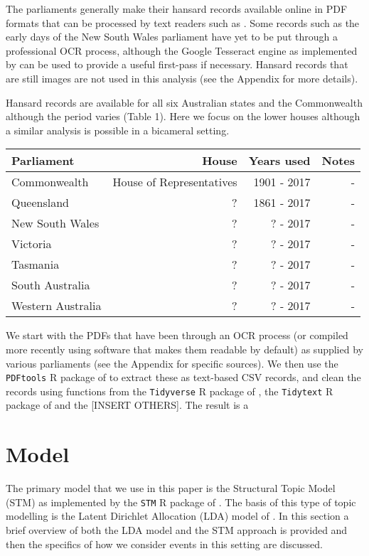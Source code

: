 \documentclass[12pt,]{article}
\begin{document}
The parliaments generally make their hansard records available online in
PDF formats that can be processed by text readers such as
\citet{Ooms2018pdftools}. Some records such as the early days of the New
South Wales parliament have yet to be put through a professional OCR
process, although the Google Tesseract engine as implemented by
\citet{Ooms2018tesseract} can be used to provide a useful first-pass if
necessary. Hansard records that are still images are not used in this
analysis (see the Appendix for more details).

Hansard records are available for all six Australian states and the
Commonwealth although the period varies (Table 1). Here we focus on the
lower houses although a similar analysis is possible in a bicameral
setting.

\begin{longtable}[]{@{}lrrr@{}}
\toprule
Parliament & House & Years used & Notes\tabularnewline
\midrule
\endhead
Commonwealth & House of Representatives & 1901 - 2017 & -\tabularnewline
Queensland & ? & 1861 - 2017 & -\tabularnewline
New South Wales & ? & ? - 2017 & -\tabularnewline
Victoria & ? & ? - 2017 & -\tabularnewline
Tasmania & ? & ? - 2017 & -\tabularnewline
South Australia & ? & ? - 2017 & -\tabularnewline
Western Australia & ? & ? - 2017 & -\tabularnewline
\bottomrule
\end{longtable}

We start with the PDFs that have been through an OCR process (or
compiled more recently using software that makes them readable by
default) as supplied by various parliaments (see the Appendix for
specific sources). We then use the \texttt{PDFtools} R package of
\citet{Ooms2018pdftools} to extract these as text-based CSV records, and
clean the records using functions from the \texttt{Tidyverse} R package
of \citet{WickhamHadleyTidyverse}, the \texttt{Tidytext} R package of
\citet{SilgeRobinson2016} and the {[}INSERT OTHERS{]}. The result is a

\section{Model}\label{model}

The primary model that we use in this paper is the Structural Topic
Model (STM) as implemented by the \texttt{STM} R package of
\citet{RobertsStewartAiroldiRPackage}. The basis of this type of topic
modelling is the Latent Dirichlet Allocation (LDA) model of
\citet{Blei2003latent}. In this section a brief overview of both the LDA
model and the STM approach is provided and then the specifics of how we
consider events in this setting are discussed.
\end{document}

